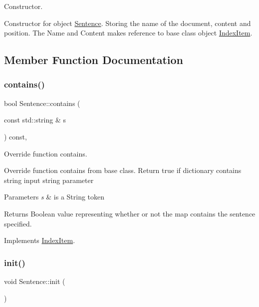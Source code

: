 Constructor. 

Constructor for object \hyperlink{class_sentence}{Sentence}. Storing the name of the document, content and position. The Name and Content makes reference to base class object \hyperlink{class_index_item}{Index\+Item}. 

\subsection{Member Function Documentation}
\mbox{\label{class_sentence_a867c17dbf3ef55c8708faa120ffad162}} 
\subsubsection{\texorpdfstring{contains()}{contains()}}
{\footnotesize\ttfamily bool Sentence\+::contains (\begin{DoxyParamCaption}\item[{const std\+::string \&}]{s }\end{DoxyParamCaption}) const\hspace{0.3cm}{\ttfamily [override]}, {\ttfamily [virtual]}}



Override function contains. 

Override function contains from base class. Return true if dictionary contains string input string parameter


\begin{DoxyParams}{Parameters}
{\em s} & is a String token \\
\hline
\end{DoxyParams}
\begin{DoxyReturn}{Returns}
Boolean value representing whether or not the map contains the sentence specified. 
\end{DoxyReturn}


Implements \hyperlink{class_index_item_a534d96bf041a485ed124663b9cded2fb}{Index\+Item}.

\mbox{\label{class_sentence_ad450504df67b1a466288c1d7d1165813}} 
\subsubsection{\texorpdfstring{init()}{init()}}
{\footnotesize\ttfamily void Sentence\+::init (\begin{DoxyParamCaption}{ }\end{DoxyParamCaption})\hspace{0.3cm}{\ttfamily [private]}}



